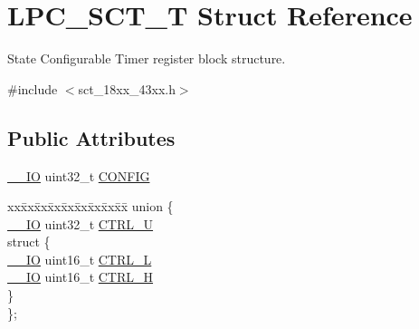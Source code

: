 \hypertarget{struct_l_p_c___s_c_t___t}{}\section{L\+P\+C\+\_\+\+S\+C\+T\+\_\+T Struct Reference}
\label{struct_l_p_c___s_c_t___t}


State Configurable Timer register block structure.  




{\ttfamily \#include $<$sct\+\_\+18xx\+\_\+43xx.\+h$>$}

\subsection*{Public Attributes}
\begin{DoxyCompactItemize}
\item 
\hyperlink{core__sc300_8h_aec43007d9998a0a0e01faede4133d6be}{\+\_\+\+\_\+\+IO} uint32\+\_\+t \hyperlink{struct_l_p_c___s_c_t___t_a547339230de8c959e1edabc81af46a81}{C\+O\+N\+F\+IG}
\item 
\begin{tabbing}
xx\=xx\=xx\=xx\=xx\=xx\=xx\=xx\=xx\=\kill
union \{\\
\>\hyperlink{core__sc300_8h_aec43007d9998a0a0e01faede4133d6be}{\_\_IO} uint32\_t \hyperlink{struct_l_p_c___s_c_t___t_a4e3bf94731abfdd323b6faffc7122090}{CTRL\_U}\\
\>struct \{\\
\>\>\hyperlink{core__sc300_8h_aec43007d9998a0a0e01faede4133d6be}{\_\_IO} uint16\_t \hyperlink{struct_l_p_c___s_c_t___t_a1c3f4fdf16a920ff77d676a0cc35e199}{CTRL\_L}\\
\>\>\hyperlink{core__sc300_8h_aec43007d9998a0a0e01faede4133d6be}{\_\_IO} uint16\_t \hyperlink{struct_l_p_c___s_c_t___t_ae37ee187622ee3e64dc243adb94e80fb}{CTRL\_H}\\
\>\} \\
\}; \\


\end{tabbing}
\end{DoxyCompactItemize}
